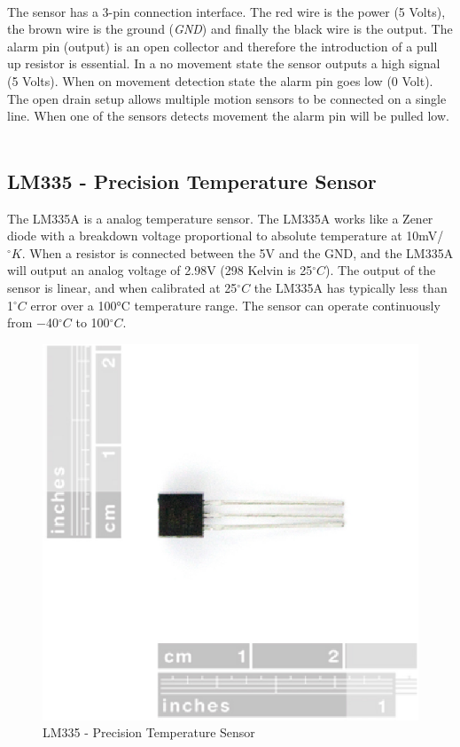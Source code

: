 \documentclass[12pt,a4paper]{report}
\begin{document}
\ \\
The sensor has a 3-pin connection interface. The red wire is the power (5 Volts), the brown wire is the ground (\textit{GND}) and finally the black wire is the output. The alarm pin (output) is an open collector and therefore the introduction of a pull up resistor is essential. In a  no movement state the sensor outputs a high signal (5 Volts). When on movement detection state the alarm pin goes low (0 Volt). The open drain setup allows multiple motion sensors to be connected on a single line. When one of the sensors detects movement the alarm pin will be pulled low.
\ \\
%
\subsection{LM335 - Precision Temperature Sensor}
%
The LM335A is a analog temperature sensor. The LM335A works like a Zener diode with a breakdown voltage proportional to absolute temperature at 10mV/$^\circ K$. When a resistor is connected between the 5V and the GND, and the LM335A will output an analog voltage of 2.98V (298 Kelvin is 25$^\circ C$).  The output of the sensor is linear, and when calibrated at 25$^\circ C$ the LM335A has typically less than 1$^\circ C$ error over a 100°C temperature range. The sensor can operate continuously from −40$^\circ C$ to 100$^\circ C$. 
\ \\
\begin{figure}[H]
\centering
\includegraphics*[scale=0.3]{lm335}
\caption{LM335 - Precision Temperature Sensor}
\end{figure}
\ \\
%
\end{document}
